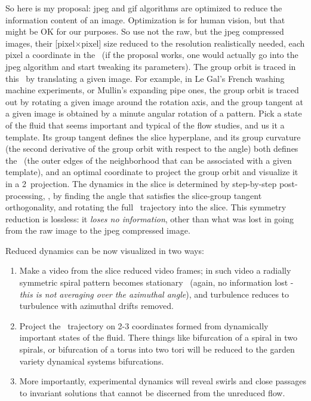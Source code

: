 \begin{description}
So here is my proposal: jpeg and gif algorithms are optimized to reduce
the information content of an image. Optimization is for human vision,
but that might be OK for our purposes. So use not the raw, but the jpeg
compressed images, their [pixel$\times$pixel] size reduced to the
resolution realistically needed, each pixel a coordinate in the \statesp\
(if the proposal works, one would actually go into the jpeg algorithm and
start tweaking its parameters).
The group orbit is traced in this \statesp\ by translating a given image.
For example, in Le Gal's French washing machine experiments, or Mullin's
expanding pipe ones, the group orbit is traced out by rotating a given
image around the rotation axis, and the group tangent at a given image is
obtained by a minute angular rotation of a pattern. Pick a state of the
fluid that seems important and typical of the flow studies, and us it a
template. Its group tangent defines the slice hyperplane, and its group
curvature (the second derivative of the group orbit with respect to the
angle) both defines the \sset\ (the outer edges of the neighborhood that can be
associated with a given template), and an optimal coordinate to project
the group orbit and visualize it in a 2\dmn\ projection. The dynamics in
the slice is determined by step-by-step post-processing, \ie, by finding
the angle that satisfies the slice-group tangent orthogonality, and
rotating the full \statesp\ trajectory into the slice. This symmetry reduction is
lossless: it \emph{loses no information}, other than what was lost in
going from the raw image to the jpeg compressed image.

Reduced dynamics can be now visualized in two ways:
\begin{enumerate}
    \item Make a video from the slice reduced video frames; in such video a radially
symmetric spiral
pattern becomes stationary \reqv\ (again, no information lost - \emph{this is
not averaging over the azimuthal angle}), and
turbulence reduces to turbulence with azimuthal drifts removed.

    \item Project the \statesp\ trajectory on 2-3 coordinates formed from
dynamically important states of the fluid\rf{GHCW07}. There things like
bifurcation of a spiral in two spirals, or bifurcation of a torus into
two tori will be reduced to the garden variety dynamical systems
bifurcations.

    \item More importantly, experimental dynamics will reveal swirls and
close passages to invariant solutions that cannot be discerned from the
unreduced flow.


\end{enumerate}
\end{description}
